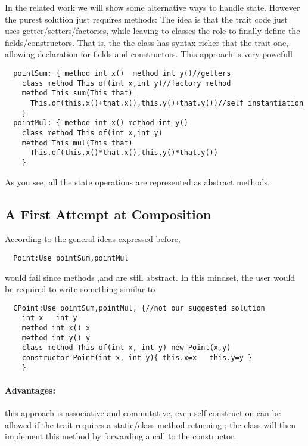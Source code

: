 In the related work we will show some alternative ways to handle state.
However the purest solution just requires methods:
  The idea is that
  the trait code just uses getter/setters/factories, while leaving
  to classes the role to finally define the fields/constructors.
  That is, the  the class has syntax richer that the trait one,
  allowing declaration for fields and constructors.
  This approach is very powefull~\cite{wang2016classless}
 
\begin{lstlisting}
  pointSum: { method int x()  method int y()//getters
    class method This of(int x,int y)//factory method
    method This sum(This that)
      This.of(this.x()+that.x(),this.y()+that.y())//self instantiation
    }
  pointMul: { method int x() method int y()
    class method This of(int x,int y)
    method This mul(This that)
      This.of(this.x()*that.x(),this.y()*that.y())
    }
\end{lstlisting}

As you see, all the state operations are represented as abstract methods.

\subsection{A First Attempt at Composition}
According to the general ideas expressed before,
\begin{lstlisting}
  Point:Use pointSum,pointMul
\end{lstlisting}  

\noindent would fail since methods \Q@x@,\Q@y@ and \Q@of@ are still abstract.
In this mindset, the user would be required to write something similar to

\begin{lstlisting}
  CPoint:Use pointSum,pointMul, {//not our suggested solution
    int x   int y
    method int x() x       
    method int y() y
    class method This of(int x, int y) new Point(x,y)
    constructor Point(int x, int y){ this.x=x   this.y=y }
    }
\end{lstlisting}

\paragraph*{Advantages:} 
this approach is associative and commutative, even self construction
  can be allowed if the trait requires a static/class method
  returning \Q@This@; the class will then implement this method by forwarding
  a call to the constructor.
  
